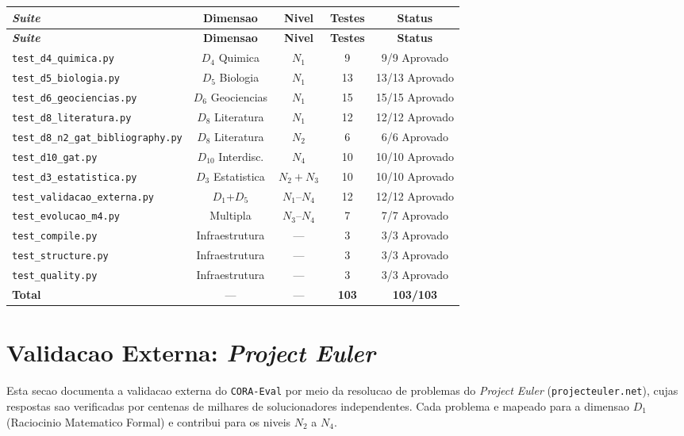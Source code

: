 \begin{longtable}{|l|c|c|c|c|}
\hline
\textbf{\textit{Suite}} & \textbf{Dimensao} & \textbf{Nivel} & \textbf{Testes} & \textbf{Status} \\
\hline
\endfirsthead
\hline
\textbf{\textit{Suite}} & \textbf{Dimensao} & \textbf{Nivel} & \textbf{Testes} & \textbf{Status} \\
\hline
\endhead
\hline
\endfoot
\texttt{test\_d4\_quimica.py} & $D_4$ Quimica & $N_1$ & 9 & 9/9 Aprovado \\
\hline
\texttt{test\_d5\_biologia.py} & $D_5$ Biologia & $N_1$ & 13 & 13/13 Aprovado \\
\hline
\texttt{test\_d6\_geociencias.py} & $D_6$ Geociencias & $N_1$ & 15 & 15/15 Aprovado \\
\hline
\texttt{test\_d8\_literatura.py} & $D_8$ Literatura & $N_1$ & 12 & 12/12 Aprovado \\
\hline
\texttt{test\_d8\_n2\_gat\_bibliography.py} & $D_8$ Literatura & $N_2$ & 6 & 6/6 Aprovado \\
\hline
\texttt{test\_d10\_gat.py} & $D_{10}$ Interdisc. & $N_4$ & 10 & 10/10 Aprovado \\
\hline
\texttt{test\_d3\_estatistica.py} & $D_3$ Estatistica & $N_2+N_3$ & 10 & 10/10 Aprovado \\
\hline
\texttt{test\_validacao\_externa.py} & $D_1$+$D_5$ & $N_1$--$N_4$ & 12 & 12/12 Aprovado \\
\hline
\texttt{test\_evolucao\_m4.py} & Multipla & $N_3$--$N_4$ & 7 & 7/7 Aprovado \\
\hline
\texttt{test\_compile.py} & Infraestrutura & --- & 3 & 3/3 Aprovado \\
\hline
\texttt{test\_structure.py} & Infraestrutura & --- & 3 & 3/3 Aprovado \\
\hline
\texttt{test\_quality.py} & Infraestrutura & --- & 3 & 3/3 Aprovado \\
\hline
\textbf{Total} & --- & --- & \textbf{103} & \textbf{103/103} \\
\hline
\end{longtable}

\newpage

\section{Validacao Externa: \textit{Project Euler}}

Esta secao documenta a validacao externa do \texttt{CORA-Eval} por meio da resolucao de problemas do \textit{Project Euler} (\texttt{projecteuler.net}), cujas respostas sao verificadas por centenas de milhares de solucionadores independentes. Cada problema e mapeado para a dimensao $D_1$ (Raciocinio Matematico Formal) e contribui para os niveis $N_2$ a $N_4$.

